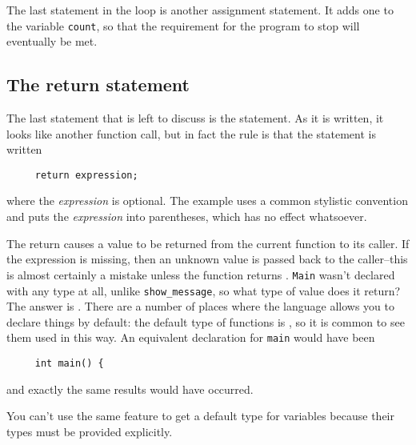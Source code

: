    The last statement in the loop is another assignment statement. It adds
    one to the variable \texttt{count}, so that the requirement for the program
    to stop will eventually be met.


  

  \subsection{The return statement}
   

   The last statement that is left to discuss is the \return{}
    statement. As it is written, it looks like another function call, but in
    fact the rule is that the statement is written


   \begin{Verbatim}
     return expression;
   \end{Verbatim}

   where the \textit{expression} is optional. The example uses a common
    stylistic convention and puts the \textit{expression} into parentheses,
    which has no effect whatsoever.


   The return causes a value to be returned from the current function to its
    caller. If the expression is missing, then an unknown value is passed back
    to the caller--this is almost certainly a mistake unless the function
    returns \void. \texttt{Main} wasn't declared with any type
    at all, unlike \texttt{show\_message}, so what type of value does it
    return? The answer is \kint. There are a number of places where
    the language allows you to declare things by default: the default type of
    functions is \kint, so it is common to see them used in this
    way. An equivalent declaration for \texttt{main} would have been


   \begin{Verbatim}
     int main() {
     \end{Verbatim}

   and exactly the same results would have occurred.


   You can't use the same feature to get a default type for variables
    because their types must be provided explicitly.


